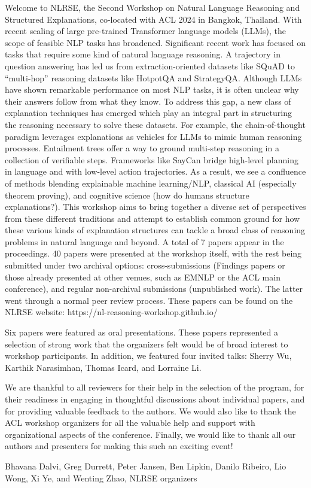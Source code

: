 Welcome to NLRSE, the Second Workshop on Natural Language Reasoning and Structured Explanations, co-located with ACL 2024 in Bangkok, Thailand. With recent scaling of large pre-trained Transformer language models (LLMs), the scope of feasible NLP tasks has broadened. Significant recent work has focused on tasks that require some kind of natural language reasoning. A trajectory in question answering has led us from extraction-oriented datasets like SQuAD to “multi-hop” reasoning datasets like HotpotQA and StrategyQA. Although LLMs have shown remarkable performance on most NLP tasks, it is often unclear why their answers follow from what they know. To address this gap, a new class of explanation techniques has emerged which play an integral part in structuring the reasoning necessary to solve these datasets. For example, the chain-of-thought paradigm leverages explanations as vehicles for LLMs to mimic human reasoning processes. Entailment trees offer a way to ground multi-step reasoning in a collection of verifiable steps. Frameworks like SayCan bridge high-level planning in language and with low-level action trajectories. As a result, we see a confluence of methods blending explainable machine learning/NLP, classical AI (especially theorem proving), and cognitive science (how do humans structure explanations?). This workshop aims to bring together a diverse set of perspectives from these different traditions and attempt to establish common ground for how these various kinds of explanation structures can tackle a broad class of reasoning problems in natural language and beyond. A total of 7 papers appear in the proceedings. 40 papers were presented at the workshop itself, with the rest being submitted under two archival options: cross-submissions (Findings papers or those already presented at other venues, such as EMNLP or the ACL main conference), and regular non-archival submissions (unpublished work). The latter went through a normal peer review process. These papers can be found on the NLRSE website: https://nl-reasoning-workshop.github.io/

Six papers were featured as oral presentations. These papers represented a selection of strong work that the organizers felt would be of broad interest to workshop participants. In addition, we featured four invited talks: Sherry Wu, Karthik Narasimhan, Thomas Icard, and Lorraine Li.

We are thankful to all reviewers for their help in the selection of the program, for their readiness in engaging in thoughtful discussions about individual papers, and for providing valuable feedback to the authors. We would also like to thank the ACL workshop organizers for all the valuable help and support with organizational aspects of the conference. Finally, we would like to thank all our authors and presenters for making this such an exciting event!

Bhavana Dalvi, Greg Durrett, Peter Jansen, Ben Lipkin, Danilo Ribeiro, Lio Wong, Xi Ye, and Wenting
Zhao, NLRSE organizers